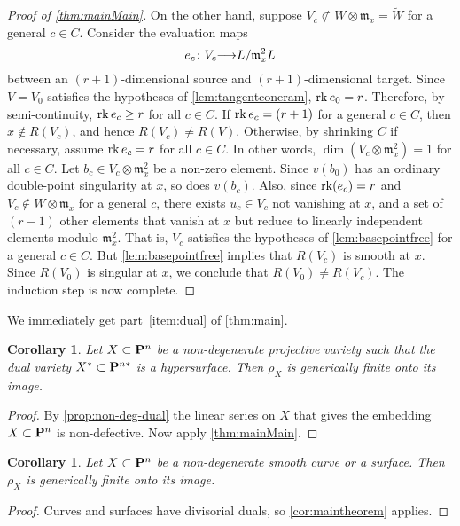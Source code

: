 \documentclass[11pt,reqno]{amsart}
\theoremstyle{plain}
\newtheorem{corollary}[theorem]{Corollary}
\theoremstyle{definition}
\theoremstyle{remark}
\numberwithin{equation}{section}
\renewcommand{\to}{{\longrightarrow}}
\numberwithin{equation}{section}
\begin{document}
\begin{proof}[Proof of \autoref{thm:mainMain}]
  On the other hand, suppose $V_c \not \subset W \otimes \mathfrak m_x = \widetilde W$ for a general $c \in C$.
  Consider the evaluation maps
  \[ e_c \from V_c \to L / \mathfrak m_x^2 L \]
  between an $(r+1)$-dimensional source and $(r+1)$-dimensional target.
  Since $V = V_0$ satisfies the hypotheses of \autoref{lem:tangentconeram}, $\rk e_0 = r$.
  Therefore, by semi-continuity, $\rk e_c \geq r$ for all $c \in C$.
  If $\rk e_c = (r+1)$ for a general $c \in C$, then $x \not \in R(V_c)$, and hence $R(V_c) \neq R(V)$.
  Otherwise, by shrinking $C$ if necessary, assume $\rk e_c = r$ for all $c \in C$.
  In other words, $\dim (V_c \otimes \mathfrak m_x^2) = 1$ for all $c \in C$.
  Let $b_c \in V_c \otimes \mathfrak m_x^2$ be a non-zero element.
  Since $v(b_0)$ has an ordinary double-point singularity at $x$, so does $v(b_c)$.
  Also, since $\rk (e_c) = r$ and $V_c \not \in W \otimes \mathfrak m_x$ for a general $c$, there exists $u_c \in V_c$ not vanishing at $x$, and a set of $(r-1)$ other elements that vanish at $x$ but reduce to linearly independent elements modulo $\mathfrak m_x^2$.
  That is, $V_c$ satisfies the hypotheses of \autoref{lem:basepointfree} for a general $c \in C$.
  But \autoref{lem:basepointfree} implies that $R(V_c)$ is smooth at $x$.
  Since $R(V_0)$ is singular at $x$, we conclude that $R(V_0) \neq R(V_c)$.
  The induction step is now complete.
\end{proof}

We immediately get part~\eqref{item:dual} of \autoref{thm:main}.
\begin{corollary}
  \label{cor:maintheorem} Let $X \subset \P^{n}$ be a non-degenerate projective variety such that the dual variety $X^{*} \subset \P^{n*}$ is a hypersurface. Then $\rho_{X}$ is generically finite onto its image.
\end{corollary}
\begin{proof}
  By \autoref{prop:non-deg-dual} the linear series on $X$ that gives the embedding $X \subset \P^n$ is non-defective.
  Now apply \autoref{thm:mainMain}.
\end{proof}

\begin{corollary}\label{cor:lowdim}
  Let $X \subset \P^n$ be a non-degenerate smooth curve or a surface.
  Then $\rho_X$ is generically finite onto its image.
\end{corollary}
\begin{proof}
  Curves and surfaces have divisorial duals, so \autoref{cor:maintheorem} applies.
\end{proof}
\end{document}
